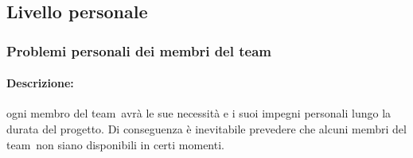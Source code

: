 \documentclass[../PianoProgetto.tex]{subfiles}
\begin{document}
\newpage
\subsection{Livello personale}

\subsubsection{Problemi personali dei membri del team}
\label{sec:Problemi personali dei membri del team}

	\paragraph*{Descrizione:} ogni membro del team\g\ avrà le sue necessità e i suoi impegni personali lungo la durata del progetto. Di conseguenza è inevitabile prevedere che alcuni membri del team\g\ non siano disponibili in certi momenti.
	 
	
\end{document}
